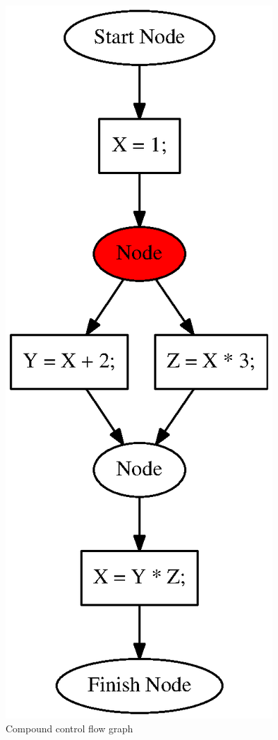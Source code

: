 \begin{figure}[h!]
    \begin{center}
        \includegraphics[scale=0.4]{Graphs/cfg_example.eps}
    \end{center}
    \caption{Compound control flow graph}
    \label{cfg_example}
\end{figure} 

